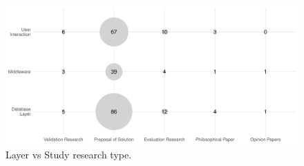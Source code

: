 \begin{figure}[hptb]
    \centering
    \includegraphics[width=\textwidth]{images/3_mapping/layer_vs_type}
    \caption{ Layer vs Study research type.}
    \label{fig:mapping/layer_vs_type}
\end{figure}

